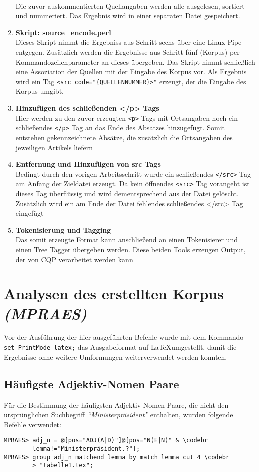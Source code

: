\documentclass[%
	type=document,%
  	style=article,%
  	media=print,
  	pages=oneside,%
  	prefixLecturer=Dozenten:,
  	author=multiple,
]{unihildesheim} %
\newcommand{\codebr}{\textbf{\rotatebox[origin=c]{180}{$\Rsh$}}}
\begin{document}
\begin{enumerate}
  \\ Die zuvor auskommentierten Quellangaben werden alle ausgelesen, sortiert
  und nummeriert. Das Ergebnis wird in einer separaten Datei gespeichert.
  \item \textbf{Skript: source\_encode.perl}
  \\Dieses Skript nimmt die Ergebniss aus Schritt sechs über eine Linux-Pipe
  entgegen. Zusätzlich werden die Ergebnisse aus Schritt fünf (Korpus) per
  Kommandozeilenparameter an dieses übergeben. Das Skript nimmt schließlich eine
  Assoziation der Quellen mit der Eingabe des Korpus vor. Als Ergebnis wird ein
  Tag \texttt{<src code="\{QUELLENNUMMER\}>"} erzeugt, der die Eingabe des
  Korpus umgibt.
  \item \textbf{Hinzufügen des schließenden </p> Tags}
  \\ Hier werden zu den zuvor erzeugten \texttt{<p>} Tags mit Ortsangaben noch
  ein schließendes \texttt{</p>} Tag an das Ende des Absatzes hinzugefügt. Somit
  entstehen gekennzeichnete Absätze, die zusätzlich die Ortsangaben des jeweiligen
  Artikels liefern
  \item \textbf{Entfernung und Hinzufügen von src Tags}
  \\ Bedingt durch den vorigen Arbeitsschritt wurde ein schließendes
  \texttt{</src>} Tag am Anfang der Zieldatei erzeugt. Da kein öffnendes
  \texttt{<src>} Tag vorangeht ist dieses Tag überflüssig und wird
  dementsprechend aus der Datei gelöscht.
  Zusätzlich wird ein am Ende der Datei fehlendes schließendes </src> Tag
  eingefügt
  \item \textbf{Tokenisierung und Tagging}
  \\ Das somit erzeugte Format kann anschließend an einen Tokenisierer und einen
  Tree Tagger übergeben werden. Diese beiden Tools erzeugen Output, der von CQP
  verarbeitet werden kann
\end{enumerate}

\section{Analysen des erstellten Korpus \textit{(MPRAES)}}
Vor der Ausführung der hier ausgeführten Befehle wurde mit dem Kommando
\texttt{set PrintMode latex;} das Ausgabeformat auf \LaTeX umgestellt, damit die
Ergebnisse ohne weitere Umformungen weiterverwendet werden konnten.


\subsection{Häufigste Adjektiv-Nomen Paare}
Für die Bestimmung der häufigsten Adjektiv-Nomen Paare, die nicht den
ursprünglichen Suchbegriff \textit{"`Ministerpräsident"'} enthalten, wurden
folgende Befehle verwendet:
\begin{Verbatim}[frame=single,label=CQP,commandchars=\\\{\}]
MPRAES> adj_n = @[pos="ADJ(A|D)"]@[pos="N(E|N)" & \codebr
        lemma!="Ministerpräsident.?"];
MPRAES> group adj_n matchend lemma by match lemma cut 4 \codebr
        > "tabelle1.tex";
\end{Verbatim}
\end{document}
